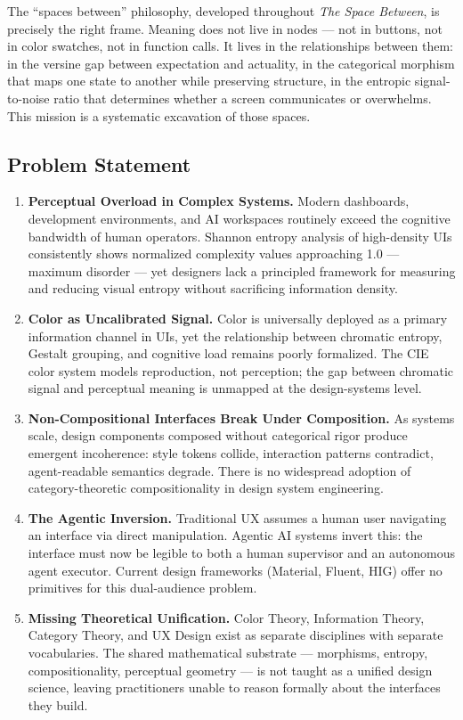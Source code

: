 \documentclass[11pt,letterpaper]{article}
\begin{document}
The ``spaces between'' philosophy, developed throughout \textit{The Space Between}, is precisely the right frame. Meaning does not live in nodes --- not in buttons, not in color swatches, not in function calls. It lives in the relationships between them: in the versine gap between expectation and actuality, in the categorical morphism that maps one state to another while preserving structure, in the entropic signal-to-noise ratio that determines whether a screen communicates or overwhelms. This mission is a systematic excavation of those spaces.

\subsection{Problem Statement}

\begin{enumerate}[leftmargin=2em, itemsep=0.5em]
  \item \textbf{Perceptual Overload in Complex Systems.} Modern dashboards, development environments, and AI workspaces routinely exceed the cognitive bandwidth of human operators. Shannon entropy analysis of high-density UIs consistently shows normalized complexity values approaching 1.0 --- maximum disorder --- yet designers lack a principled framework for measuring and reducing visual entropy without sacrificing information density.

  \item \textbf{Color as Uncalibrated Signal.} Color is universally deployed as a primary information channel in UIs, yet the relationship between chromatic entropy, Gestalt grouping, and cognitive load remains poorly formalized. The CIE color system models reproduction, not perception; the gap between chromatic signal and perceptual meaning is unmapped at the design-systems level.

  \item \textbf{Non-Compositional Interfaces Break Under Composition.} As systems scale, design components composed without categorical rigor produce emergent incoherence: style tokens collide, interaction patterns contradict, agent-readable semantics degrade. There is no widespread adoption of category-theoretic compositionality in design system engineering.

  \item \textbf{The Agentic Inversion.} Traditional UX assumes a human user navigating an interface via direct manipulation. Agentic AI systems invert this: the interface must now be legible to both a human supervisor and an autonomous agent executor. Current design frameworks (Material, Fluent, HIG) offer no primitives for this dual-audience problem.

  \item \textbf{Missing Theoretical Unification.} Color Theory, Information Theory, Category Theory, and UX Design exist as separate disciplines with separate vocabularies. The shared mathematical substrate --- morphisms, entropy, compositionality, perceptual geometry --- is not taught as a unified design science, leaving practitioners unable to reason formally about the interfaces they build.
\end{enumerate}
\end{document}

